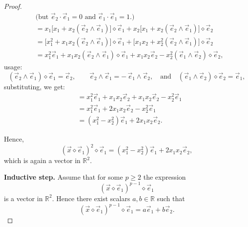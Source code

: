 \documentclass{amsart}
\theoremstyle{plain}
\numberwithin{equation}{section}
\begin{document}
\begin{proof}
\begin{align*}
& \text{(but $\vec{e}_2 \cdot \vec{e}_1 = 0$ and $\vec{e}_1 \cdot \vec{e}_1 = 1.$)}\\
&= x_{1}\Big[ x_{1}+x_{2}(\vec{e}_{2}\wedge \vec{e}_{1}) \Big]\diamond \vec{e}_{1}
 + x_{2}\Big[ x_{1}+x_{2}(\vec{e}_{2}\wedge \vec{e}_{1}) \Big]\diamond \vec{e}_{2} \\[4pt]
&= \Big[ x_{1}^{2}+x_{1}x_{2}(\vec{e}_{2}\wedge \vec{e}_{1}) \Big]\diamond \vec{e}_{1}
 + \Big[ x_{1}x_{2}+x_{2}^{2}(\vec{e}_{2}\wedge \vec{e}_{1}) \Big]\diamond \vec{e}_{2} \\[4pt]
&= x_{1}^{2}\vec{e}_{1}
 + x_{1}x_{2}(\vec{e}_{2}\wedge \vec{e}_{1})\diamond \vec{e}_{1}
 + x_{1}x_{2}\vec{e}_{2}
 - x_{2}^{2}(\vec{e}_{1}\wedge \vec{e}_{2})\diamond \vec{e}_{2},
\end{align*}
usage:
\[
(\vec{e}_{2}\wedge \vec{e}_{1}) \diamond \vec{e}_{1} = \vec{e}_{2}, \quad \quad
\vec{e}_{2}\wedge \vec{e}_{1} = -\,\vec{e}_{1}\wedge \vec{e}_{2}, \quad \text{and}\quad 
(\vec{e}_{1}\wedge \vec{e}_{2}) \diamond \vec{e}_{2} = \vec{e}_{1},
\]
substituting, we get:
\begin{align*}
&= x_{1}^{2}\vec{e}_{1}+x_{1}x_{2}\vec{e}_{2}+x_{1}x_{2}\vec{e}_{2}- x_{2}^{2}\vec{e}_{1} \\[4pt]
&= x_{1}^{2}\vec{e}_{1}+2x_{1}x_{2}\vec{e}_{2}- x_{2}^{2}\vec{e}_{1} \\[4pt]
&= (x_{1}^{2}-x_{2}^{2})\vec{e}_{1}
+ 2x_{1}x_{2}\vec{e}_{2}.
\end{align*}

%

Hence,
\[
(\vec x\diamond \vec e_1)^2\diamond \vec e_1
=
(x_1^2-x_2^2)\vec e_1
+
2x_1x_2\vec e_2,
\]
which is again a vector in $\mathbb R^2$.

\textbf{Inductive step.}
Assume that for some $p\ge 2$ the expression
\[
(\vec x \diamond \vec e_1)^{p-1}\diamond \vec e_1
\]
is a vector in $\mathbb{R}^2$. Hence there exist scalars
$a,b \in \mathbb{R}$ such that
\[
(\vec x \diamond \vec e_1)^{p-1}\diamond \vec e_1
=
a \vec e_1 + b \vec e_2.
\]


\end{proof}
\end{document}
